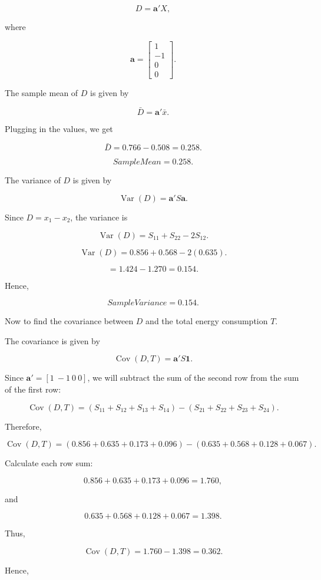 \documentclass{article}
\begin{document}
$$
D=\mathbf{a}'X,
$$

where

$$
\mathbf{a}=
\begin{bmatrix}
1\\
-1\\
0\\
0
\end{bmatrix}.
$$

The sample mean of $D$ is given by

$$
\bar{D}=\mathbf{a}'\bar{x}.
$$

Plugging in the values, we get

$$
\bar{D}
=
0.766-0.508
=
0.258.
$$

$$
\boxed{Sample Mean=0.258}.
$$

The variance of $D$ is given by

$$
\operatorname{Var}(D)=\mathbf{a}'S\mathbf{a}.
$$

Since $D=x_1-x_2$, the variance is

$$
\operatorname{Var}(D)
=
S_{11}+S_{22}-2S_{12}.
$$

$$
\operatorname{Var}(D)
=
0.856+0.568-2(0.635).
$$

$$
=
1.424-1.270
=
0.154.
$$

Hence,

$$
\boxed{Sample Variance=0.154}.
$$

Now to find the covariance between $D$ and the total energy consumption $T$.

The covariance is given by

$$
\operatorname{Cov}(D,T)=\mathbf{a}'S\mathbf{1}.
$$

Since $\mathbf{a}'=[1\ -1\ 0\ 0]$, we will subtract the sum of the second row
from the sum of the first row:

$$
\operatorname{Cov}(D,T)
=
(S_{11}+S_{12}+S_{13}+S_{14})
-
(S_{21}+S_{22}+S_{23}+S_{24}).
$$

Therefore,

$$
\operatorname{Cov}(D,T)
=
(0.856+0.635+0.173+0.096)
-
(0.635+0.568+0.128+0.067).
$$

Calculate each row sum:

$$
0.856+0.635+0.173+0.096
=
1.760,
$$

and

$$
0.635+0.568+0.128+0.067
=
1.398.
$$

Thus,

$$
\operatorname{Cov}(D,T)
=
1.760-1.398
=
0.362.
$$

Hence,
\end{document}
